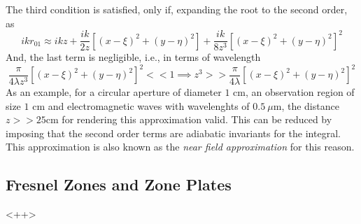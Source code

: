\documentclass[../electromagnetism.tex]{subfiles}
\begin{document}
The third condition is satisfied, only if, expanding the root to the second order, as 
\begin{equation}
	ikr_{01}\approx ikz+\frac{ik}{2z}\left[ (x-\xi)^2+(y-\eta)^2 \right]+\frac{ik}{8z^3}\left[ (x-\xi)^2+(y-\eta)^2 \right]^2
	\label{eq:expapprox.fresnel}
\end{equation}
And, the last term is negligible, i.e., in terms of wavelength
\begin{equation}
	\frac{\pi}{4\lambda z^3}\left[ (x-\xi)^2+(y-\eta)^2 \right]^2<<1\implies z^3>>\frac{\pi}{4\lambda}\left[ (x-\xi)^2+(y-\eta)^2 \right]^2
	\label{eq:fresnel.approx}
\end{equation}
As an example, for a circular aperture of diameter $1$ cm, an observation region of size $1$ cm and electromagnetic waves with wavelenghts of $0.5\ \mu$m, the distance $z>>25$cm for rendering this approximation valid. This can be reduced by imposing that the second order terms are adiabatic invariants for the integral. This approximation is also known as the \textit{near field approximation} for this reason.
\subsection{Fresnel Zones and Zone Plates}
<++>
\end{document}
